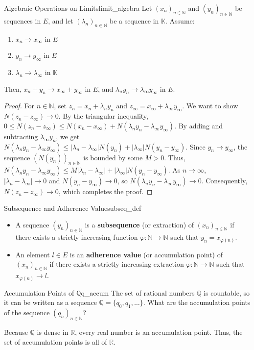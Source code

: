\documentclass[11pt, a4paper]{article}
\newcommand{\R}{\mathbb{R}}
\newcommand{\N}{\mathbb{N}}
\newcommand{\Q}{\mathbb{Q}}
\begin{document}
\begin{proposition}{Algebraic Operations on Limits}{limit_algebra}
Let $(x_n)_{n \in \N}$ and $(y_n)_{n \in \N}$ be sequences in $E$, and let $(\lambda_n)_{n \in \N}$ be a sequence in $\mathbb{K}$. Assume:
\begin{enumerate}
    \item $x_n \to x_\infty$ in $E$
    \item $y_n \to y_\infty$ in $E$
    \item $\lambda_n \to \lambda_\infty$ in $\mathbb{K}$
\end{enumerate}
Then, $x_n + y_n \to x_\infty + y_\infty$ in $E$, and $\lambda_n y_n \to \lambda_\infty y_\infty$ in $E$.
\end{proposition}
\begin{proof}
For $n \in \N$, set $z_n = x_n + \lambda_n y_n$ and $z_\infty = x_\infty + \lambda_\infty y_\infty$. We want to show $N(z_n - z_\infty) \to 0$.
By the triangular inequality, $0 \le N(z_n - z_\infty) \le N(x_n - x_\infty) + N(\lambda_n y_n - \lambda_\infty y_\infty)$.
By adding and subtracting $\lambda_\infty y_n$, we get $N(\lambda_n y_n - \lambda_\infty y_\infty) \le |\lambda_n - \lambda_\infty| N(y_n) + |\lambda_\infty| N(y_n - y_\infty)$.
Since $y_n \to y_\infty$, the sequence $(N(y_n))_{n \in \N}$ is bounded by some $M > 0$.
Thus, $N(\lambda_n y_n - \lambda_\infty y_\infty) \le M |\lambda_n - \lambda_\infty| + |\lambda_\infty| N(y_n - y_\infty)$.
As $n \to \infty$, $|\lambda_n - \lambda_\infty| \to 0$ and $N(y_n - y_\infty) \to 0$, so $N(\lambda_n y_n - \lambda_\infty y_\infty) \to 0$.
Consequently, $N(z_n - z_\infty) \to 0$, which completes the proof.
\end{proof}

\begin{definition}{Subsequence and Adherence Value}{subseq_def}
\begin{itemize}
    \item A sequence $(y_n)_{n \in \N}$ is a \textbf{subsequence} (or extraction) of $(x_n)_{n \in \N}$ if there exists a strictly increasing function $\varphi: \N \to \N$ such that $y_n = x_{\varphi(n)}$.
    \item An element $l \in E$ is an \textbf{adherence value} (or accumulation point) of $(x_n)_{n \in \N}$ if there exists a strictly increasing extraction $\varphi: \N \to \N$ such that $x_{\varphi(n)} \to l$.
\end{itemize}
\end{definition}

\begin{problem}{Accumulation Points of $\Q$}{q_accum}
The set of rational numbers $\Q$ is countable, so it can be written as a sequence $\Q = \{q_0, q_1, \dots\}$. What are the accumulation points of the sequence $(q_n)_{n \in \N}$?
\end{problem}
\begin{remark}{}{}
Because $\Q$ is dense in $\R$, every real number is an accumulation point. Thus, the set of accumulation points is all of $\R$.
\end{remark}
\end{document}
